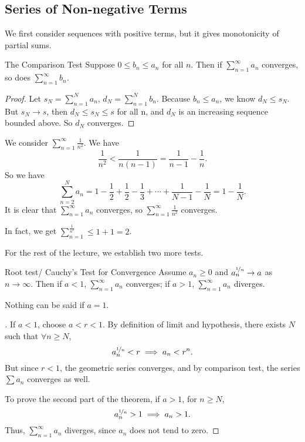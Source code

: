 \subsection{Series of Non-negative Terms}
We first consider sequences with positive terms, but it gives monotonicity of partial sums.
\begin{theorem}{The Comparison Test}{}
    Suppose \(0\leq b_n\leq a_n\) for all \(n\). Then if \(\sum\limits_{n=1}^{\infty} a_n\) converges, so does \(\sum\limits_{n=1}^{\infty} b_n\).
\end{theorem}
\begin{proof}
    Let \(s_N = \sum\limits_{n=1}^{N} a_n\), \(d_N = \sum\limits_{n=1}^{N} b_n\). Because \(b_n \leq a_n\), we know \(d_N \leq s_N\). But \(s_N \to s\), then \(d_N \leq s_N \leq s\) for all n, and \(d_N\) is an increasing sequence bounded above. So \(d_N\) converges.
\end{proof}
\begin{example}
    We consider \(\sum\limits_{n=1}^{\infty} \frac{1}{n^2}\). We have
    \[
        \frac{1}{n^2} < \frac{1}{n(n-1)} = \frac{1}{n - 1}-\frac{1}{n}.
    \]
    So we have
    \[
        \sum\limits_{n=2}^{N} a_n = 1 - \frac{1}{2} + \frac{1}{2}- \frac{1}{3}+\cdots+\frac{1}{N-1}-\frac{1}{N} = 1 - \frac{1}{N}.
    \]
    It is clear that \(\sum\limits_{n=1}^{\infty} a_n\) converges, so \(\sum\limits_{n=1}^{\infty} \frac{1}{n^{2}}\) converges.

    In fact, we get \(\sum\limits_{n=1}^{\frac{1}{n^2}} \leq 1 + 1 = 2\).
\end{example}
For the rest of the lecture, we establish two more tests.
\begin{theorem}{Root test/ Cauchy's Test for Convergence}{}
    Assume \(a_n \geq 0\) and \(a_n^{\nicefrac{1}{n}}\to a\) as \(n\to \infty\). Then if \(a<1\), \(\sum\limits_{n=1}^{\infty} a_n\) converges; if \(a>1\), \(\sum\limits_{n=1}^{\infty} a_n\) diverges.
\end{theorem}
\begin{remark}
    Nothing can be said if \(a=1\).
\end{remark}
\begin{proof}[]
    If \(a<1\), choose \(a<r<1\). By definition of limit and hypothesis, there exists \(N\) such that \(\forall n \geq N\),
    \[
        a_n^{\nicefrac{1}{n}}<r \implies a_n < r^n.
    \]
    But since \(r<1\), the geometric series converges, and by comparison test, the series \(\sum a_n\) converges as well.

    To prove the second part of the theorem, if \(a>1\), for \(n\geq N\),
    \[a_n^{\nicefrac{1}{n}}>1\implies a_n > 1.\]
    Thus, \(\sum\limits_{n=1}^{\infty} a_{n}\) diverges, since \(a_n\) does not tend to zero.
\end{proof}
